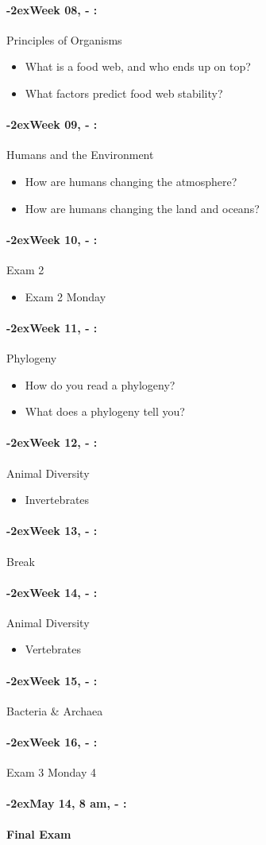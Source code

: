 \documentclass[11pt]{article}
\newcommand{\week}[1]{%
  \paragraph*{\kern-2ex\quad #1, \syldate{\today} - \AdvanceDate[4]\syldate{\today}:}%
  \ifdim\wd1=\wd\MONDAY
    \AdvanceDate[7]
  \else
    \AdvanceDate[7]
  \fi%
}
\begin{document}
\week{Week 08} Principles of Organisms
\begin{itemize}
\item What is a food web, and who ends up on top?
\item What factors predict food web stability?
\end{itemize}

\week{Week 09} Humans and the Environment
\begin{itemize}
\item How are humans changing the atmosphere?
\item How are humans changing the land and oceans?
\end{itemize}

\week{Week 10} Exam 2
\begin{itemize}
\item Exam 2 Monday
\end{itemize}

\week{Week 11} Phylogeny
\begin{itemize}
\item How do you read a phylogeny?
\item What does a phylogeny tell you?
\end{itemize}

\week{Week 12} Animal Diversity
\begin{itemize}
\item Invertebrates
\end{itemize}


\week{Week 13} Break

\week{Week 14} Animal Diversity
\begin{itemize}
\item Vertebrates
\end{itemize}

\week{Week 15} Bacteria \& Archaea


\week{Week 16} Exam 3 Monday 4


\week{May 14, 8 am} \textbf{Final Exam}
\end{document}
